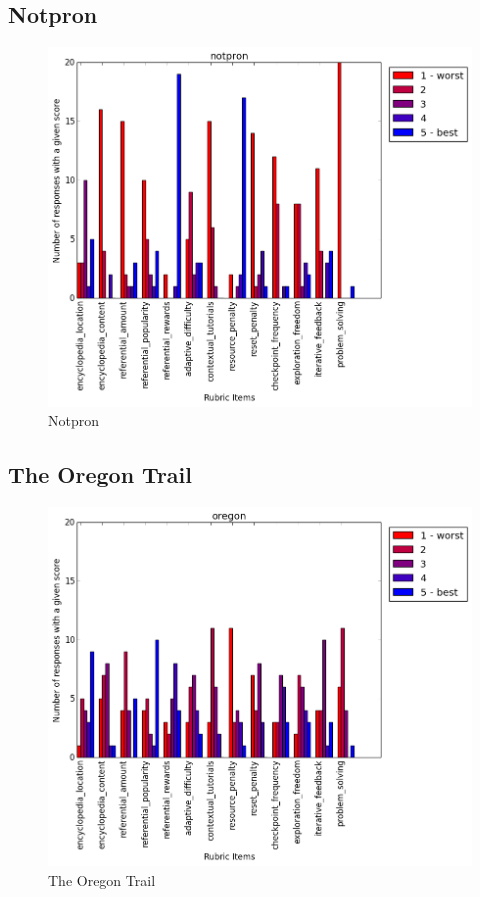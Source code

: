 			\subsection{Notpron}

				\begin{figure}[] 
				\centering 
				\includegraphics[width=\textwidth, height=.4\textheight, keepaspectratio=true]{notpron_scores.png} 
				\caption{Notpron}
				\end{figure}

			\subsection{The Oregon Trail}

				\begin{figure}[] 
				\centering 
				\includegraphics[width=\textwidth, height=.4\textheight, keepaspectratio=true]{oregon_scores.png} 
				\caption{The Oregon Trail}
				\end{figure}

